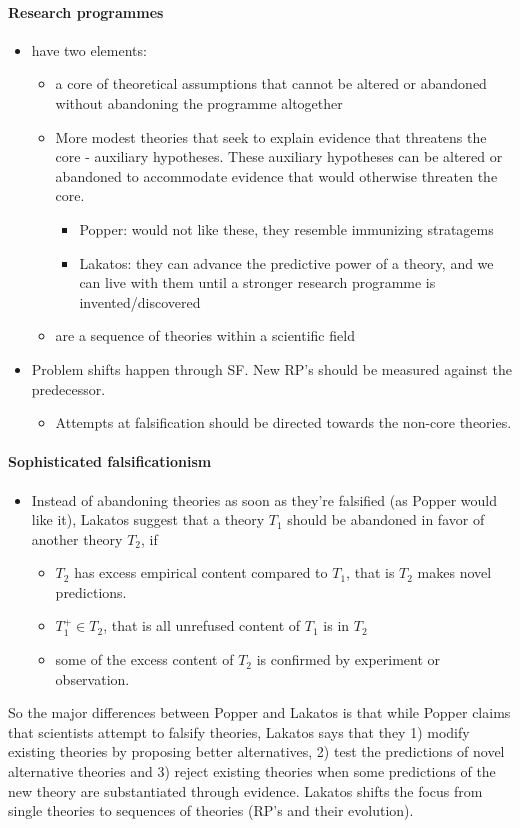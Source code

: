 \documentclass[12pt, a4paper]{article}
\begin{document}
\begin{multicols}{2}
\paragraph*{Research programmes}
\begin{itemize}
\item have two elements:
\begin{itemize}
\item a core of theoretical assumptions that cannot be altered or abandoned without abandoning the programme altogether
\item More modest theories that seek to explain evidence that threatens the core - auxiliary hypotheses. These auxiliary hypotheses can be altered or abandoned to accommodate evidence that would otherwise threaten the core. 
\begin{itemize}
\item Popper: would not like these, they resemble immunizing stratagems
\item Lakatos: they can advance the predictive power of a theory, and we can live with them until a stronger research programme is invented/discovered
\end{itemize}
\item are a sequence of theories within a scientific field
\end{itemize}
\item Problem shifts happen through SF. New RP's should be measured against the predecessor.
\begin{itemize}
\item Attempts at falsification should be directed towards the non-core theories.
\end{itemize}
\end{itemize}
\paragraph{Sophisticated falsificationism}
\begin{itemize}
\item Instead of abandoning theories as soon as they're falsified (as Popper would like it), Lakatos suggest that a theory $T_1$ should be abandoned in favor of another theory $T_2$, if 
\begin{itemize}
\item $T_2$ has excess empirical content compared to $T_1$, that is $T_2$ makes novel predictions.
\item $T_1^+ \in T_2$, that is all unrefused content of $T_1$ is in $T_2$
\item some of the excess content of $T_2$ is confirmed by experiment or observation.
\end{itemize}
\end{itemize}
So the major differences between Popper and Lakatos is that while Popper claims that scientists attempt to falsify theories, Lakatos says that they 1) modify existing theories by proposing better alternatives, 2) test the predictions of novel alternative theories and 3) reject existing theories when some predictions of the new theory are substantiated through evidence. Lakatos shifts the focus from single theories to sequences of theories (RP's and their evolution).


\end{multicols}
\end{document}
